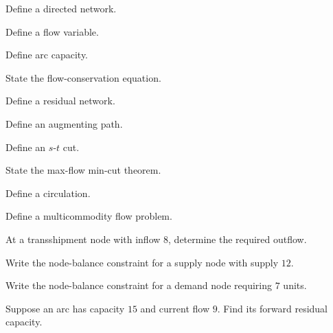 \begin{exercise}[1]
Define a directed network.
\end{exercise}

\begin{exercise}[1]
Define a flow variable.
\end{exercise}

\begin{exercise}[1]
Define arc capacity.
\end{exercise}

\begin{exercise}[1]
State the flow-conservation equation.
\end{exercise}

\begin{exercise}[1]
Define a residual network.
\end{exercise}

\begin{exercise}[1]
Define an augmenting path.
\end{exercise}

\begin{exercise}[1]
Define an \(s\)-\(t\) cut.
\end{exercise}

\begin{exercise}[1]
State the max-flow min-cut theorem.
\end{exercise}

\begin{exercise}[1]
Define a circulation.
\end{exercise}

\begin{exercise}[1]
Define a multicommodity flow problem.
\end{exercise}

\begin{exercise}[2]
At a transshipment node with inflow \(8\), determine the required outflow.
\end{exercise}

\begin{exercise}[2]
Write the node-balance constraint for a supply node with supply \(12\).
\end{exercise}

\begin{exercise}[2]
Write the node-balance constraint for a demand node requiring \(7\) units.
\end{exercise}

\begin{exercise}[2]
Suppose an arc has capacity \(15\) and current flow \(9\). Find its forward
residual capacity.
\end{exercise}

